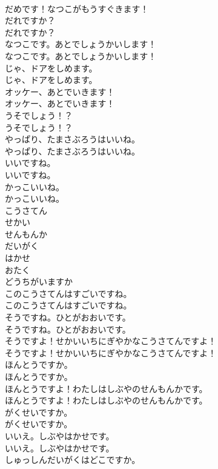 \documentclass[8pt]{extreport}
\begin{document}
\begin{CJK}{UTF8}{min}
\\	だめです！なつこがもうすぐきます！ 
\\	だれですか？	
\\	だれですか？ 
\\	なつこです。あとでしょうかいします！	
\\	なつこです。あとでしょうかいします！ 
\\	じゃ、ドアをしめます。	
\\	じゃ、ドアをしめます。 
\\	オッケー、あとでいきます！	
\\	オッケー、あとでいきます！ 
\\	うそでしょう！？	
\\	うそでしょう！？ 
\\	やっぱり、たまさぶろうはいいね。	
\\	やっぱり、たまさぶろうはいいね。 
\\	いいですね。	
\\	いいですね。 
\\	かっこいいね。	
\\	かっこいいね。 
\\	こうさてん
\\	せかい
\\	せんもんか
\\	だいがく
\\	はかせ
\\	おたく
\\	どうちがいますか
\\	このこうさてんはすごいですね。	
\\	このこうさてんはすごいですね。 
\\	そうですね。ひとがおおいです。	
\\	そうですね。ひとがおおいです。 
\\	そうですよ！せかいいちにぎやかなこうさてんですよ！	
\\	そうですよ！せかいいちにぎやかなこうさてんですよ！ 
\\	ほんとうですか。	
\\	ほんとうですか。 
\\	ほんとうですよ！わたしはしぶやのせんもんかです。	
\\	ほんとうですよ！わたしはしぶやのせんもんかです。 
\\	がくせいですか。	
\\	がくせいですか。 
\\	いいえ。しぶやはかせです。	
\\	いいえ。しぶやはかせです。 
\\	しゅっしんだいがくはどこですか。	

\end{CJK}
\end{document}
